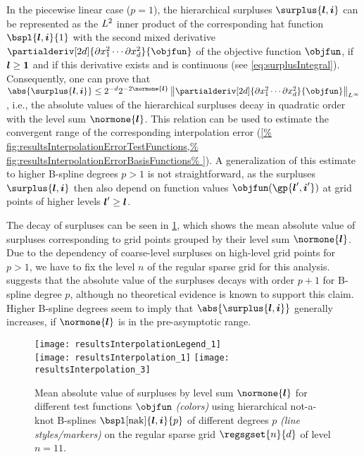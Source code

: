 In the piecewise linear case ($p = 1$),
the hierarchical surpluses $\surplus{\*l,\*i}$
can be represented as the $L^2$ inner product of
the corresponding hat function $\bspl{\*l,\*i}{1}$ with the
second mixed derivative
$\partialderiv[2d]{\partialdiff x_1^2 \dotsm \partialdiff x_d^2}{\objfun}$
of the objective function $\objfun$,
if ${\boldsymbol{l}} \ge {\boldsymbol{1}}$ and if this derivative exists and is continuous
(see \cref{eq:surplusIntegral}).
Consequently, one can prove that
$\abs{\surplus{\*l,\*i}} \le 2^{-d} 2^{-2\normone{\*l}}
\normLinftyscaled{
  \partialderiv[2d]{\partialdiff x_1^2 \dotsm \partialdiff x_d^2}{\objfun}
}$ \cite{Bungartz04Sparse},
i.e., the absolute values of the hierarchical surpluses
decay  in quadratic order with the level sum $\normone{\*l}$.
This relation can be used to estimate the convergent range
of the corresponding interpolation error (\cref{%
  fig:resultsInterpolationErrorTestFunctions,%
  fig:resultsInterpolationErrorBasisFunctions%
}).
A generalization of this estimate to higher B-spline degrees $p > 1$
is not straightforward, as the surpluses $\surplus{\*l,\*i}$
then also depend on function values $\objfun(\gp{\*l',\*i'})$ at
grid points of higher levels ${\boldsymbol{l}}' \ge {\boldsymbol{l}}$.

The decay of surpluses can be seen in \cref{fig:resultsDecaySurpluses},
which shows the mean absolute value of surpluses corresponding to
grid points grouped by their level sum $\normone{\*l}$.
Due to the dependency of coarse-level surpluses on high-level grid points
for $p > 1$,
we have to fix the level $n$ of the regular sparse grid for this analysis.
 suggests that the
absolute value of the surpluses decays with order $p + 1$ for
B-spline degree $p$, although no theoretical evidence
is known to support this claim.
Higher B-spline degrees seem to imply that
$\abs{\surplus{\*l,\*i}}$ generally increases, if $\normone{\*l}$ is
in the pre-asymptotic range.

\begin{figure}
  \texttt{[image: resultsInterpolationLegend\_1]}\\[2mm]%
  \texttt{[image: resultsInterpolation\_1]}%
  \hfill%
  \texttt{[image: resultsInterpolation\_3]}%
  \caption[Decay of surpluses for different test functions]{%
    Mean absolute value of surpluses by level sum $\normone{\*l}$
    for different test functions $\objfun$ \emph{(colors)}
    using hierarchical not-a-knot B-splines
    $\bspl[\nak]{\*l,\*i}{p}$ of different degrees $p$
    \emph{(line styles/markers)} on
    the regular sparse grid $\regsgset{n}{d}$ of level $n = 11$.%
  }%
  \label{fig:resultsDecaySurpluses}%
\end{figure}



